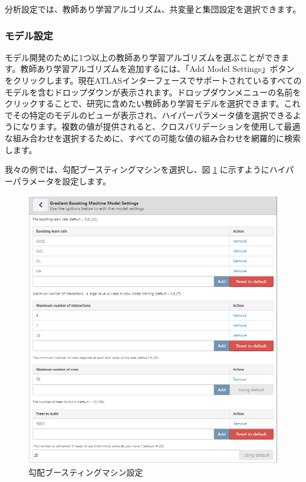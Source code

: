 \documentclass[
  11pt]{book}
\theoremstyle{definition}
\theoremstyle{definition}
\theoremstyle{definition}
\theoremstyle{definition}
\theoremstyle{remark}
\begin{document}
分析設定では、教師あり学習アルゴリズム、共変量と集団設定を選択できます。

\subsubsection*{モデル設定}\label{ux30e2ux30c7ux30ebux8a2dux5b9a}

モデル開発のために1つ以上の教師あり学習アルゴリズムを選ぶことができます。教師あり学習アルゴリズムを追加するには、「Add Model Settings」ボタンをクリックします。現在ATLASインターフェースでサポートされているすべてのモデルを含むドロップダウンが表示されます。ドロップダウンメニューの名前をクリックすることで、研究に含めたい教師あり学習モデルを選択できます。これでその特定のモデルのビューが表示され、ハイパーパラメータ値を選択できるようになります。複数の値が提供されると、クロスバリデーションを使用して最適な組み合わせを選択するために、すべての可能な値の組み合わせを網羅的に検索します。

我々の例では、勾配ブースティングマシンを選択し、図 \ref{fig:gbmSettings} に示すようにハイパーパラメータを設定します。

\begin{figure}

{\centering \includegraphics[width=1\linewidth]{images/PatientLevelPrediction/gbmSettings} 

}

\caption{勾配ブースティングマシン設定}\label{fig:gbmSettings}
\end{figure}
\end{document}
